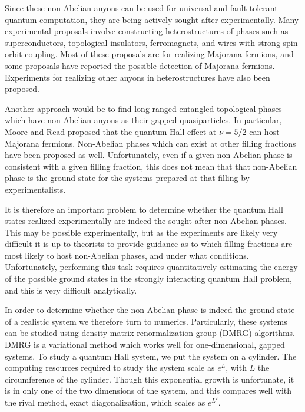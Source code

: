Since these non-Abelian anyons can be used for universal and fault-tolerant quantum computation, they are being actively sought-after experimentally. Many experimental proposals involve constructing heterostructures of phases such as superconductors, topological insulators, ferromagnets, and wires with strong spin-orbit coupling\cite{AliceaReview}. Most of these proposals are for realizing Majorana fermions, and some proposals have reported the possible detection of Majorana fermions\cite{MourikZuo:InSbWire:2012,Nadj-PergeYazdani:2014}. Experiments for realizing other anyons in heterostructures have also been proposed\cite{SOCALBS}.

Another approach would be to find long-ranged entangled topological phases which have non-Abelian anyons as their gapped quasiparticles. In particular, Moore and Read\cite{MooreRead} proposed that the quantum Hall effect at $\nu=5/2$ can host Majorana fermions. Non-Abelian phases which can exist at other filling fractions have been proposed as well\cite{Read-PhysRevB.59.8084,BondersonSlingerland}. Unfortunately, even if a given non-Abelian phase is consistent with a given filling fraction, this does not mean that that non-Abelian phase is the ground state for the systems prepared at that filling by experimentalists. 

It is therefore an important problem to determine whether the quantum Hall states realized experimentally are indeed the sought after non-Abelian phases. This may be possible experimentally, but as the experiments are likely very difficult it is up to theorists to provide guidance as to which filling fractions are most likely to host non-Abelian phases, and under what conditions. Unfortunately, performing this task requires quantitatively estimating the energy of the possible ground states in the strongly interacting quantum Hall problem, and this is very difficult analytically.

In order to determine whether the non-Abelian phase is indeed the ground state of a realistic system we therefore turn to numerics. Particularly, these systems can be studied using density matrix renormalization group (DMRG) algorithms\cite{ZaletelQHdmrg13, ZaletelMixing}. DMRG is a variational method which works well for one-dimensional, gapped systems. To study a quantum Hall system, we put the system on a cylinder. The computing resources required to study the system scale as $e^L$, with $L$ the circumference of the cylinder. Though this exponential growth is unfortunate, it is in only one of the two dimensions of the system, and this compares well with the rival method, exact diagonalization, which scales as $e^{L^2}$. 

